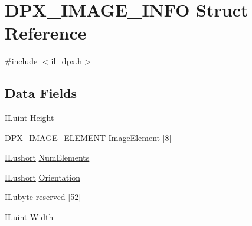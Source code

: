 \hypertarget{struct_d_p_x___i_m_a_g_e___i_n_f_o}{\section{D\-P\-X\-\_\-\-I\-M\-A\-G\-E\-\_\-\-I\-N\-F\-O Struct Reference}
\label{struct_d_p_x___i_m_a_g_e___i_n_f_o}
}


{\ttfamily \#include $<$il\-\_\-dpx.\-h$>$}

\subsection*{Data Fields}
\begin{DoxyCompactItemize}
\item 
\hyperlink{il_8h_ac6508d0e9c19e32f32e00d54b5b8cf30}{I\-Luint} \hyperlink{struct_d_p_x___i_m_a_g_e___i_n_f_o_a8a8093d76b61a95fc96df24af29b107a}{Height}
\item 
\hyperlink{struct_d_p_x___i_m_a_g_e___e_l_e_m_e_n_t}{D\-P\-X\-\_\-\-I\-M\-A\-G\-E\-\_\-\-E\-L\-E\-M\-E\-N\-T} \hyperlink{struct_d_p_x___i_m_a_g_e___i_n_f_o_a55c8b9c6a1e159559134644560149bd1}{Image\-Element} \mbox{[}8\mbox{]}
\item 
\hyperlink{il_8h_af6287b43748354a7c4864da43ae56962}{I\-Lushort} \hyperlink{struct_d_p_x___i_m_a_g_e___i_n_f_o_a3a024d7ed125a2166f51ad81e4057a61}{Num\-Elements}
\item 
\hyperlink{il_8h_af6287b43748354a7c4864da43ae56962}{I\-Lushort} \hyperlink{struct_d_p_x___i_m_a_g_e___i_n_f_o_a531396180402904d5a3e6682f675432b}{Orientation}
\item 
\hyperlink{il_8h_a8d2f04500100a86d1b00e98ab1b15a33}{I\-Lubyte} \hyperlink{struct_d_p_x___i_m_a_g_e___i_n_f_o_a91afcb45fc1b2422045d944bcb0b7117}{reserved} \mbox{[}52\mbox{]}
\item 
\hyperlink{il_8h_ac6508d0e9c19e32f32e00d54b5b8cf30}{I\-Luint} \hyperlink{struct_d_p_x___i_m_a_g_e___i_n_f_o_a4146e7b2b0b4097e0e335f9b348392bf}{Width}
\end{DoxyCompactItemize}


